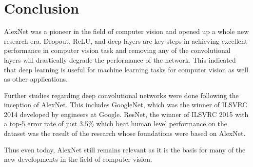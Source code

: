 \documentclass[11pt]{report}
\begin{document}
\chapter{Conclusion}
AlexNet was a pioneer in the field of computer vision and opened up a whole new research era. Dropout, ReLU, and deep layers are key steps in achieving excellent performance in computer vision task and removing any of the convolutional layers will drastically degrade the performance of the network. This indicated that deep learning is useful for machine learning tasks for computer vision as well as other applications.

Further studies regarding deep convolutional networks were done following the inception of AlexNet. This includes GoogleNet, which was the winner of ILSVRC 2014 developed by engineers at Google. ResNet, the winner of ILSVRC 2015 with a top-5 error rate of just 3.5\% which beat human level performance on the dataset was the result of the research whose foundations were based on AlexNet.

Thus even today, AlexNet still remains relevant as it is the basis for many of the new developments in the field of computer vision. 
\end{document}

